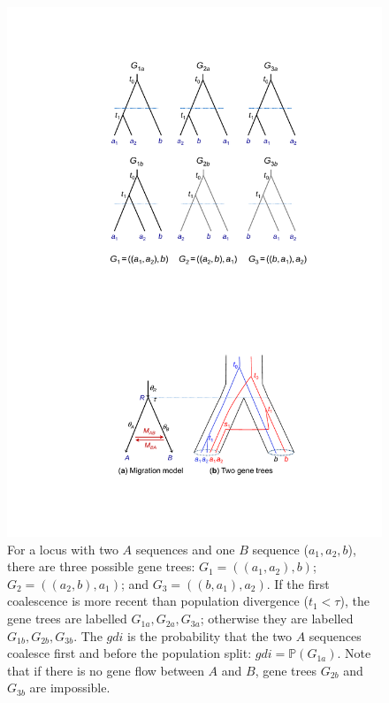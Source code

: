 \documentclass{article1}
\renewcommand{\P}{\mathbb{P}}
\begin{document}
\begin{figure} [t]
   \centering %
   \includegraphics[scale=0.6]{figs/fig-gdi-trees} %
   
   \caption{For a locus with two $A$ sequences and one $B$ sequence ($a_1, a_2, b$), there
   are three possible gene trees: $G_1 = ((a_1, a_2), b)$; $G_2 = ((a_2, b), a_1)$; and
   $G_3 = ((b, a_1), a_2)$.  If the first coalescence is more recent than population
   divergence ($t_1 < \tau$), the gene trees are labelled $G_{1a}, G_{2a}, G_{3a}$;
   otherwise they are labelled $G_{1b}, G_{2b}, G_{3b}$.  The $gdi$ is the
   probability that the two $A$ sequences coalesce first and before the population split:
   $gdi = \P(G_{1a})$.  Note that if there is no gene flow between $A$ and $B$, gene trees
   $G_{2b}$ and $G_{3b}$ are impossible.  %
   } \label{fig:gdi-trees}
\vspace{-0.5cm}
\end{figure}
\end{document}
